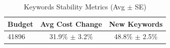 \begin{table}[htbp]
\centering
\caption{Keywords Stability Metrics (Avg $\pm$ SE)}
\begin{tabular}{lcc}
\toprule
Budget & Avg Cost Change & New Keywords \\
\midrule
41896 & 31.9\% $\pm$ 3.2\% & 48.8\% $\pm$ 2.5\% \\
\bottomrule
\end{tabular}
\end{table}